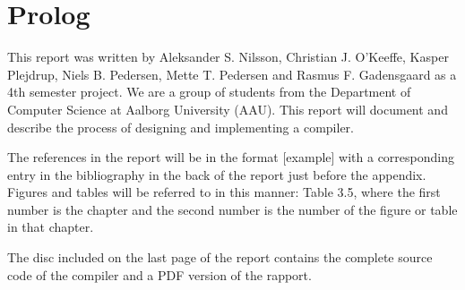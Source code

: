 \chapter{Prolog}
This report was written by Aleksander S. Nilsson, Christian J. O'Keeffe, Kasper Plejdrup, Niels  B. Pedersen, Mette T. Pedersen and Rasmus F. Gadensgaard as a 4th semester project. We are a group of students from the Department of Computer Science at Aalborg University (AAU). This report will document and describe the process of designing and implementing a compiler.

The references in the report will be in the format [example] with a corresponding entry in the bibliography in the back of the report just before the appendix. Figures and tables will be referred to in this manner: Table 3.5, where the first number is the chapter and the second number is the number of the figure or table in that chapter.

The disc included on the last page of the report contains the complete source code of the compiler and a PDF version of the rapport.
